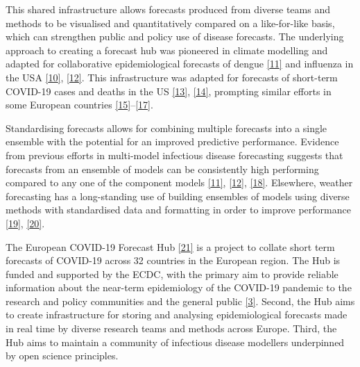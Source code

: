 \documentclass[
]{article}
\begin{document}
This shared infrastructure allows forecasts produced from diverse teams and methods to be visualised and quantitatively compared on a like-for-like basis, which can strengthen public and policy use of disease forecasts. The underlying approach to creating a forecast hub was pioneered in climate modelling and adapted for collaborative epidemiological forecasts of dengue \protect\hyperlink{ref-johanssonOpenChallengeAdvance2019}{{[}11{]}} and influenza in the USA \protect\hyperlink{ref-reichCollaborativeMultiyearMultimodel2019}{{[}10{]}}, \protect\hyperlink{ref-reichAccuracyRealtimeMultimodel2019}{{[}12{]}}. This infrastructure was adapted for forecasts of short-term COVID-19 cases and deaths in the US \protect\hyperlink{ref-cramerUnitedStatesCOVID192021}{{[}13{]}}, \protect\hyperlink{ref-rayEnsembleForecastsCoronavirus2020e}{{[}14{]}}, prompting similar efforts in some European countries \protect\hyperlink{ref-bracherPreregisteredShorttermForecasting2021}{{[}15{]}}--\protect\hyperlink{ref-bicherSupportingCOVID19PolicyMaking2021}{{[}17{]}}.

Standardising forecasts allows for combining multiple forecasts into a single ensemble with the potential for an improved predictive performance. Evidence from previous efforts in multi-model infectious disease forecasting suggests that forecasts from an ensemble of models can be consistently high performing compared to any one of the component models \protect\hyperlink{ref-johanssonOpenChallengeAdvance2019}{{[}11{]}}, \protect\hyperlink{ref-reichAccuracyRealtimeMultimodel2019}{{[}12{]}}, \protect\hyperlink{ref-viboudRAPIDDEbolaForecasting2018}{{[}18{]}}. Elsewhere, weather forecasting has a long-standing use of building ensembles of models using diverse methods with standardised data and formatting in order to improve performance \protect\hyperlink{ref-buizzaIntroductionSpecialIssue2019}{{[}19{]}}, \protect\hyperlink{ref-moranEpidemicForecastingMessier2016}{{[}20{]}}.

The European COVID-19 Forecast Hub \protect\hyperlink{ref-europeancovid-19forecasthubEuropeanCOVID19Forecast2021}{{[}21{]}} is a project to collate short term forecasts of COVID-19 across 32 countries in the European region. The Hub is funded and supported by the ECDC, with the primary aim to provide reliable information about the near-term epidemiology of the COVID-19 pandemic to the research and policy communities and the general public \protect\hyperlink{ref-europeancentrefordiseasepreventionandcontrolForecastingCOVID19Cases2021}{{[}3{]}}. Second, the Hub aims to create infrastructure for storing and analysing epidemiological forecasts made in real time by diverse research teams and methods across Europe. Third, the Hub aims to maintain a community of infectious disease modellers underpinned by open science principles.
\end{document}
